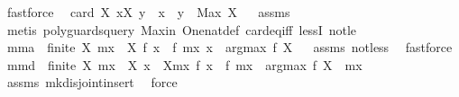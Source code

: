 \begin{isabellebody}
\ fastforce%
\endisatagproof
{\isafoldproof}%
%
\isadelimproof
%
\endisadelimproof
\isanewline
{}\isamarkupfalse%
\ \ {\isachardoublequoteopen}card\ X{\isasymge}{}{\isachardoublequoteclose}\ {\isachardoublequoteopen}{\isasymforall}x{\isasymin}X{\isachardot}\ y\ {\isachargreater}\ x{\isachardoublequoteclose}\ \ {\isachardoublequoteopen}y\ {\isachargreater}\ Max\ X{\isachardoublequoteclose}%
\isadelimproof
\ %
\endisadelimproof
%
\isatagproof
{}\isamarkupfalse%
\ assms\isanewline
{}\isamarkupfalse%
\ {\isacharparenleft}metis\ {\isacharparenleft}poly{\isacharunderscore}guards{\isacharunderscore}query{\isacharparenright}\ Max{\isacharunderscore}in\ One{\isacharunderscore}nat{\isacharunderscore}def\ card{\isacharunderscore}eq{\isacharunderscore}{}{\isacharunderscore}iff\ lessI\ not{\isacharunderscore}le{\isacharparenright}%
\endisatagproof
{\isafoldproof}%
%
\isadelimproof
%
\endisadelimproof
\isanewline
\isanewline
{}\isamarkupfalse%
\ mm{}{}a{\isacharcolon}\ \ {\isachardoublequoteopen}finite\ X{\isachardoublequoteclose}\ {\isachardoublequoteopen}mx\ {\isasymin}\ X{\isachardoublequoteclose}\ {\isachardoublequoteopen}f\ x\ {\isacharless}\ f\ mx{\isachardoublequoteclose}\ x\ {\isasymnotin}\ argmax\ f\ X{\isachardoublequoteclose}%
\isadelimproof
\ %
\endisadelimproof
%
\isatagproof
{}\isamarkupfalse%
\ assms\ not{\isacharunderscore}less\ \isamarkupfalse%
\ fastforce%
\endisatagproof
{\isafoldproof}%
%
\isadelimproof
%
\endisadelimproof
\isanewline
\isanewline
{}\isamarkupfalse%
\ mm{}{}d{\isacharcolon}\ \ {\isachardoublequoteopen}finite\ X{\isachardoublequoteclose}\ {\isachardoublequoteopen}mx\ {\isasymin}\ X{\isachardoublequoteclose}\ {\isachardoublequoteopen}{\isasymforall}x\ {\isasymin}\ X{\isacharminus}{\isacharbraceleft}mx{\isacharbraceright}{\isachardot}\ f\ x\ {\isacharless}\ f\ mx{\isachardoublequoteclose}\ \ {\isachardoublequoteopen}argmax\ f\ X\ {\isasymsubseteq}\ {\isacharbraceleft}mx{\isacharbraceright}{\isachardoublequoteclose}\isanewline
%
\isadelimproof
%
\endisadelimproof
%
\isatagproof
{}\isamarkupfalse%
\ assms\ mk{\isacharunderscore}disjoint{\isacharunderscore}insert\ \isamarkupfalse%
\ force%
\endisatagproof
{\isafoldproof}%
%
\isadelimproof
\isanewline
%
\endisadelimproof
\isanewline
{}\isamarkupfalse%

\end{isabellebody}
